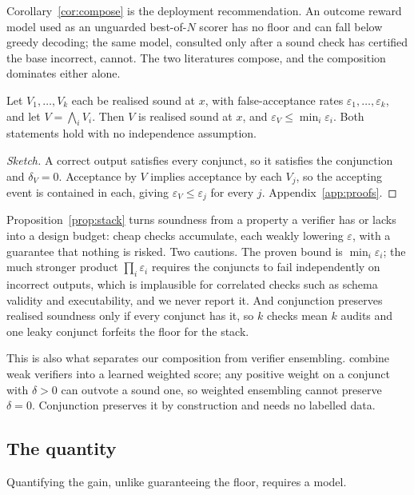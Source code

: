 \documentclass[11pt]{article}
\begin{document}
Corollary~\ref{cor:compose} is the deployment recommendation. An outcome reward model used as an unguarded best-of-$N$ scorer has no floor and can fall below greedy decoding; the same model, consulted only after a sound check has certified the base incorrect, cannot. The two literatures compose, and the composition dominates either alone.

\begin{proposition}[Stacking]\label{prop:stack}
Let $V_1,\dots,V_k$ each be realised sound at $x$, with false-acceptance rates $\varepsilon_1,\dots,\varepsilon_k$, and let $V=\bigwedge_i V_i$. Then $V$ is realised sound at $x$, and $\varepsilon_V\le\min_i\varepsilon_i$. Both statements hold with no independence assumption.
\end{proposition}
\begin{proof}[Sketch]
A correct output satisfies every conjunct, so it satisfies the conjunction and $\delta_V=0$. Acceptance by $V$ implies acceptance by each $V_j$, so the accepting event is contained in each, giving $\varepsilon_V\le\varepsilon_j$ for every $j$. Appendix~\ref{app:proofs}.
\end{proof}

Proposition~\ref{prop:stack} turns soundness from a property a verifier has or lacks into a design budget: cheap checks accumulate, each weakly lowering $\varepsilon$, with a guarantee that nothing is risked. Two cautions. The proven bound is $\min_i\varepsilon_i$; the much stronger product $\prod_i\varepsilon_i$ requires the conjuncts to fail independently on incorrect outputs, which is implausible for correlated checks such as schema validity and executability, and we never report it. And conjunction preserves realised soundness only if every conjunct has it, so $k$ checks mean $k$ audits and one leaky conjunct forfeits the floor for the stack.

This is also what separates our composition from verifier ensembling. \citet{saadfalcon2025weaver} combine weak verifiers into a learned weighted score; any positive weight on a conjunct with $\delta>0$ can outvote a sound one, so weighted ensembling cannot preserve $\delta=0$. Conjunction preserves it by construction and needs no labelled data.

\subsection{The quantity}\label{sec:quantity}
Quantifying the gain, unlike guaranteeing the floor, requires a model.
\end{document}
